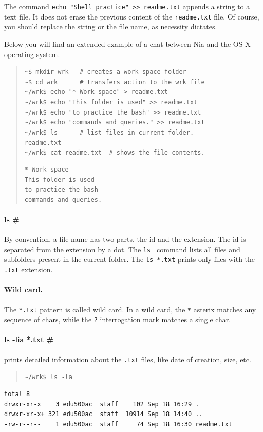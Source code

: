 \documentclass[a4paper,12pt]{book}
\begin{document}
The command \verb|echo "Shell practice" >> readme.txt|
appends a string to a text file. It does
not erase the previous content of
the \verb|readme.txt| file. Of course,
you should replace the string or the
file name, as necessity dictates.


Below you will find
an extended example of a chat between Nia and
the OS X operating system.
\begin{quote}
\verb|~$ mkdir wrk   # creates a work space folder      | \\
\verb|~$ cd wrk      # transfers action to the wrk file | \\
\verb|~/wrk$ echo "* Work space" > readme.txt | \\
\verb|~/wrk$ echo "This folder is used" >> readme.txt |\\
\verb|~/wrk$ echo "to practice the bash" >> readme.txt | \\
\verb|~/wrk$ echo "commands and queries." >> readme.txt | \\
\verb|~/wrk$ ls      # list files in current folder. | \\
\verb|readme.txt |\\
\verb|~/wrk$ cat readme.txt  # shows the file contents.| 
\begin{verbatim}
* Work space
This folder is used
to practice the bash
commands and queries.
\end{verbatim}
\end{quote}

\paragraph{ls \#} By convention, a file name has
two parts, the id and the extension. The id
is separated from the extension by a dot.
The \verb|ls | command lists all files
and subfolders present in the current folder.
The \verb|ls *.txt| prints only files
with the \verb|.txt| extension.

\paragraph{Wild card.} The \verb|*.txt| pattern
is called wild card.
In a wild card, the \verb|*| asterix matches
any sequence of chars, while the \verb|?|
interrogation mark matches a single char.

\paragraph{ls -lia *.txt \#} prints detailed
information about the \verb|.txt| files,
like date of creation, size, etc.
\begin{quote}
  \verb|~/wrk$ ls -la |  
\end{quote}
\begin{verbatim}
total 8
drwxr-xr-x    3 edu500ac  staff    102 Sep 18 16:29 .
drwxr-xr-x+ 321 edu500ac  staff  10914 Sep 18 14:40 ..
-rw-r--r--    1 edu500ac  staff     74 Sep 18 16:30 readme.txt
\end{verbatim}
\end{document}
